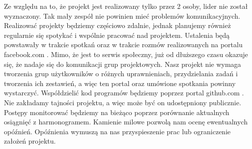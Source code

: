 Ze względu na to, że projekt jest realizowany tylko przez 2 osoby, lider nie został wyznaczony. Tak mały zespół nie powinien mieć problemów komunikacyjnych. Realizować projekty będziemy częściowo zdalnie, jednak planujemy również regularnie się spotykać i wspólnie pracować nad projektem. Ustalenia będą powstawały w trakcie spotkań oraz w trakcie rozmów realizowanych na portalu facebook.com . Mimo, że jest to serwis społeczny, już od dłuższego czasu okazuje się, że nadaje się do komunikacji grup projektowych. Nasz projekt nie wymaga tworzenia grup użytkowników o różnych uprawnieniach, przydzielania zadań i tworzenia ich zestawień, a więc ten portal oraz umówione spotkania powinny wystarczyć. \newline
Współdzielić kod programów będziemy poprzez portal github.com . Nie zakładamy tajności projektu, a więc może być on udostępniony publicznie. \newline
Postępy monitorować będziemy na bieżąco poprzez porównanie aktualnych osiągnięć z harmonogramem. Kamienie milowe pozwolą nam ocenę ewentualnych opóźnień. Opóźnienia wymuszą na nas przyspieszenie prac lub ograniczenie założeń projektu.
\textsl{}
